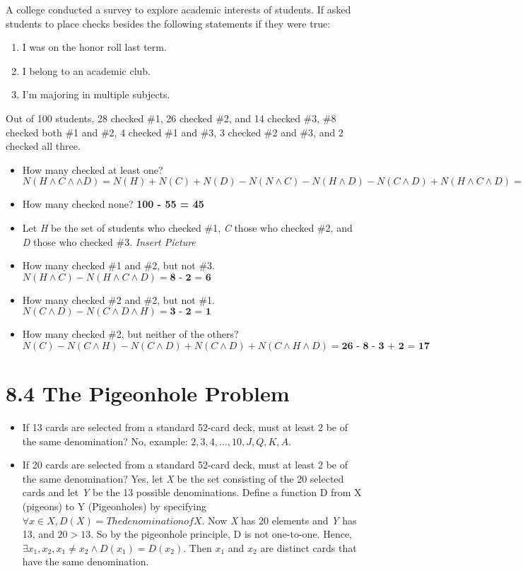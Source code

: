 \documentclass{article}
\begin{document}
A college conducted a survey to explore academic interests of students. If asked students to place checks besides the following statements if they were true:
\begin{enumerate}
    \item I was on the honor roll last term.
    \item I belong to an academic club.
    \item I'm majoring in multiple subjects.
\end{enumerate}

\noindent
Out of 100 students, 28 checked \#1, 26 checked \#2, and 14 checked \#3, \#8 checked both \#1 and \#2, 4 checked \#1 and \#3, 3 checked \#2 and \#3, and 2 checked all three.

\begin{itemize}
    \item How many checked at least one? $N(H \wedge C \wedge \wedge D) = N(H) + N(C) + N(D) - N(N \wedge C) - N(H \wedge D) - N(C \wedge D) + N(H \wedge C \wedge D) = \textbf{28 + 26 + 14 - 8 - 4 - 3 + 2} = \textbf{55}$
    \item How many checked none? \textbf{100 - 55 = 45 }
    \item Let \textit{H} be the set of students who checked \#1, \textit{C} those who checked \#2, and \textit{D} those who checked \#3. \textit{Insert Picture}
    \item How many checked \#1 and \#2, but not \#3. $N(H \wedge C) - N(H \wedge C \wedge D) = \textbf{8 - 2 = 6}$
    \item How many checked \#2 and \#2, but not \#1. $N(C \wedge D) - N(C \wedge D \wedge H) = \textbf{3 - 2 = 1}$
    \item How many checked \#2, but neither of the others? $N(C) - N(C \wedge H) - N(C \wedge D) + N(C \wedge D) + N(C \wedge H \wedge D) = \textbf{26 - 8 - 3 + 2 = 17}$
\end{itemize}

\section{8.4 The Pigeonhole Problem}
\begin{itemize}
    \item If 13 cards are selected from a standard 52-card deck, must at least 2 be of the same denomination? No, example: $2, 3, 4, \ldots, 10, J, Q, K, A$.
    \item If 20 cards are selected from a standard 52-card deck, must at least 2 be of the same denomination? Yes, let \textit{X} be the set consisting of the 20 selected cards and let \textit{Y} be the 13 possible denominations. Define a function D from X (pigeons) to Y (Pigeonholes) by specifying $\forall x \in X, D(X) = The denomination of X.$ Now \textit{X} has 20 elements and \textit{Y} has 13, and $20 > 13$. So by the pigeonhole principle, D is not one-to-one. Hence, $\exists x_1, x_2, x_1 \neq x_2 \wedge D(x_1) = D(x_2).$ Then $x_1$ and $x_2$ are distinct cards that have the same denomination.
\end{itemize}
\end{document}

